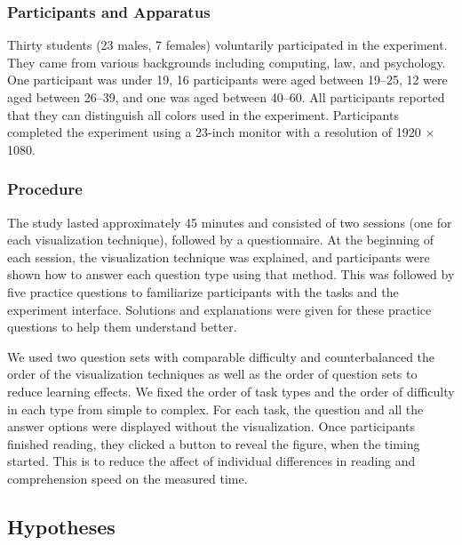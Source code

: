 \subsubsection{Participants and Apparatus} Thirty students (23 males, 7 females) voluntarily participated in the experiment. They came from various backgrounds including computing, law, and psychology. One participant was under 19, 16 participants were aged between 19--25, 12 were aged between 26--39, and one was aged between 40--60. All participants reported that they can distinguish all colors used in the experiment. Participants completed the experiment using a 23-inch monitor with a resolution of 1920 $\times$ 1080.

\subsubsection{Procedure} The study lasted approximately 45 minutes and consisted of two sessions (one for each visualization technique), followed by a questionnaire. At the beginning of each session, the visualization technique was explained, and participants were shown how to answer each question type using that method. This was followed by five practice questions to familiarize participants with the tasks and the experiment interface. Solutions and explanations were given for these practice questions to help them understand better.

We used two question sets with comparable difficulty and counterbalanced the order of the visualization techniques as well as the order of question sets to reduce learning effects. We fixed the order of task types and the order of difficulty in each type from simple to complex. For each task, the question and all the answer options were displayed without the visualization. Once participants finished reading, they clicked a button to reveal the figure, when the timing started. This is to reduce the affect of individual differences in reading and comprehension speed on the measured time. 

\subsection{Hypotheses}
\label{sec:hypotheses}

